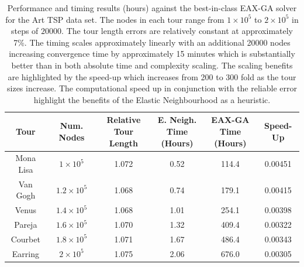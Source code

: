 \begin{table}
	\centering
	\begin{tabular}[width=0.75\textwidth]{| c||  c | c |c | c | c|}
		\hline
		Tour& Num. Nodes & \makecell{Relative Tour \\ Length} & \makecell{E. Neigh. \\ Time (Hours)} &  \makecell{EAX-GA \\ Time (Hours)} & Speed-Up\\
		\hline
		Mona Lisa & $1\times10^5$ & 1.072 & 0.52 & 114.4 & 0.00451\\
		Van Gogh & $1.2\times10^5$ & 1.068 & 0.74 & 179.1& 0.00415 \\
		Venus & $1.4\times10^5$  &1.068 & 1.01 & 254.1 & 0.00398\\
		Pareja & $1.6\times10^5$& 1.070 & 1.32 & 409.4 & 0.00322\\
		Courbet  &$1.8\times10^5$ & 1.071 & 1.67 & 486.4 & 0.00343\\
		Earring & $2\times10^5$ & 1.075 & 2.06 & 676.0 & 0.00305 \\
		\hline
	\end{tabular}
	\def\c{Performance and timing results (hours) against the best-in-class EAX-GA solver for the Art TSP data set. }
	\caption[\c]{\label{table:art} \c The nodes in each tour range from $1 \times 10^5$ to $ 2 \times 10^5$ in steps of $20000$. The tour length errors are relatively constant at approximately 7\%. The timing scales approximately linearly with an additional 20000 nodes increasing convergence time by approximately 15 minutes which is substantially better than in both absolute time and complexity scaling. The scaling benefits are highlighted by the speed-up which increases from 200 to 300 fold as the tour sizes increase. The computational speed up in conjunction with the reliable error highlight the benefits of the Elastic Neighbourhood as a heuristic.}
\end{table}

